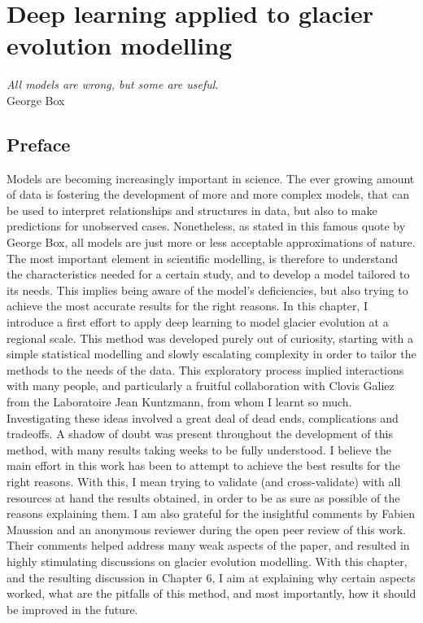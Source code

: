\chapter{Deep learning applied to glacier evolution modelling}
\label{chap:methods}

\begin{flushright}
\begin{small}
\textit{All models are wrong, but some are useful.}\\
George Box
\end{small}
\end{flushright}

\section*{Preface}

Models are becoming increasingly important in science. The ever growing amount of data is fostering the development of more and more complex models, that can be used to interpret relationships and structures in data, but also to make predictions for unobserved cases. Nonetheless, as stated in this famous quote by George Box, all models are just more or less acceptable approximations of nature. The most important element in scientific modelling, is therefore to understand the characteristics needed for a certain study, and to develop a model tailored to its needs. This implies being aware of the model's deficiencies, but also trying to achieve the most accurate results for the right reasons. In this chapter, I introduce a first effort to apply deep learning to model glacier evolution at a regional scale. This method was developed purely out of curiosity, starting with a simple statistical modelling and slowly escalating complexity in order to tailor the methods to the needs of the data. This exploratory process implied interactions with many people, and particularly a fruitful collaboration with Clovis Galiez from the Laboratoire Jean Kuntzmann, from whom I learnt so much. Investigating these ideas involved a great deal of dead ends, complications and tradeoffs. A shadow of doubt was present throughout the development of this method, with many results taking weeks to be fully understood. I believe the main effort in this work has been to attempt to achieve the best results for the right reasons. With this, I mean trying to validate (and cross-validate) with all resources at hand the results obtained, in order to be as sure as possible of the reasons explaining them. I am also grateful for the insightful comments by Fabien Maussion and an anonymous reviewer during the open peer review of this work. Their comments helped address many weak aspects of the paper, and resulted in highly stimulating discussions on glacier evolution modelling. With this chapter, and the resulting discussion in Chapter 6, I aim at explaining why certain aspects worked, what are the pitfalls of this method, and most importantly, how it should be improved in the future. 

